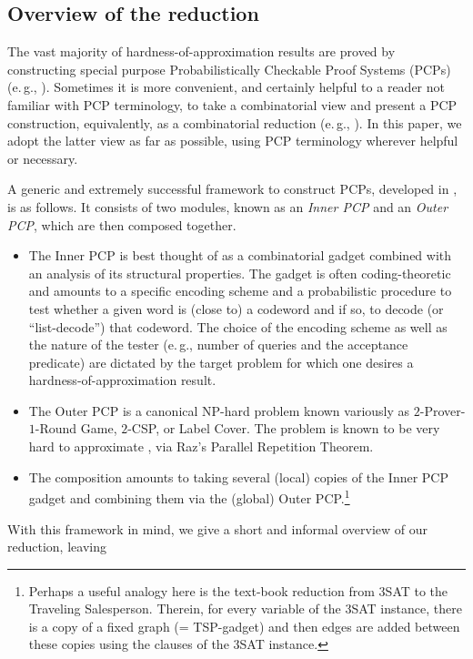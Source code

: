 \documentclass[11pt]{article}
\numberwithin{equation}{section}
\theoremstyle{definition}
\theoremstyle{plain}
\newcommand{\eg}{e.\,g.}
\begin{document}
\subsection{Overview of the reduction}

%
The vast majority %
of hardness-of-approximation results are proved by constructing special purpose Probabilistically Checkable Proof Systems (PCPs) (\eg,
\cite{ALMSS98,BGS,Has99,Has01,GHS00,Khot-quasiPCP,Chan13}). Sometimes it is more convenient, and certainly helpful
to a reader not familiar with PCP terminology, to take a combinatorial view and present a PCP construction, equivalently, as a combinatorial reduction (\eg,
\cite{DS05, Dinur07}). In this paper, we adopt the latter view as far as possible, using PCP terminology wherever helpful or necessary.

%
A generic and extremely successful framework to construct PCPs, developed in \cite{ABSS,BGS,Raz98, Has99, Has01}, is as follows.
It consists of two modules, known as an \emph{Inner PCP} and an \emph{Outer PCP}, which are then composed together.  %
%
\begin{itemize}
\item The Inner PCP is best thought of as a combinatorial gadget
combined with an analysis of its structural properties. The gadget is often coding-theoretic and
 amounts to a specific encoding scheme and a probabilistic procedure to test whether a given
word is (close to) a codeword and if so, to decode (or ``list-decode'') that codeword. The choice of the encoding scheme
as well as the nature of the
tester (\eg, number of queries and the acceptance predicate) are dictated by the target problem for which one desires a hardness-of-approximation result.
\item The Outer PCP is a canonical NP-hard problem known variously as $2$-Prover-$1$-Round Game, $2$-CSP, or Label Cover. The problem is known to be
      very hard to approximate \cite{ABSS,Raz98}, via Raz's Parallel Repetition Theorem.
\item The composition amounts to taking several (local) copies of the Inner PCP gadget and
combining %
them via the (global)
      Outer PCP.\footnote{Perhaps a useful analogy here is the text-book reduction from 3SAT to the Traveling Salesperson. Therein, for every variable
      of the 3SAT instance, there is a copy of a fixed graph (= TSP-gadget) and then edges are added between these copies using the clauses of the 3SAT instance.}
\end{itemize}
With this framework in mind, we give a short and informal overview of our reduction, leaving
\end{document}
